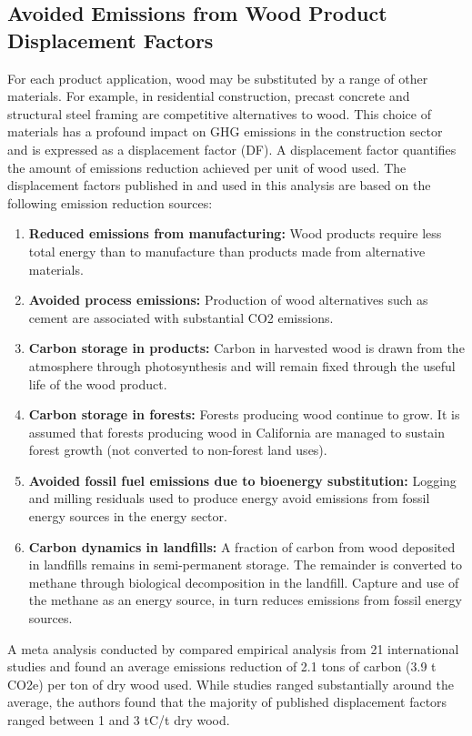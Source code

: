 \documentclass[a4paper]{article}
\begin{document}
\subsection{Avoided Emissions from Wood Product Displacement Factors}
\label{sec:orgheadline19}

For each product application, wood may be substituted by a range of other materials. For example, in
residential construction, precast concrete and structural steel framing
are competitive alternatives to wood. This choice of materials has a profound impact on \ac{GHG} emissions in the
construction sector and is expressed as a displacement
factor (DF). A displacement factor quantifies the amount of emissions
reduction achieved per unit of wood used. The displacement factors published in
\citep{Sathre2010} and used in this analysis are based on the
following emission reduction sources:

\begin{enumerate}
\item \textbf{Reduced emissions from manufacturing:} Wood products require less total
energy than to manufacture than products made from alternative materials.
\item \textbf{Avoided process emissions:} Production of wood alternatives such as cement are associated with 
substantial CO2 emissions.
\item \textbf{Carbon storage in products:} Carbon in harvested wood is drawn from
the atmosphere through photosynthesis and will remain fixed through
the useful life of the wood product.
\item \textbf{Carbon storage in forests:} Forests producing wood continue to grow.
It is assumed that forests producing wood in California are managed
to sustain forest growth (not converted to non-forest land uses).
\item \textbf{Avoided fossil fuel emissions due to bioenergy substitution:}
Logging and milling residuals used to produce energy avoid emissions
from fossil energy sources in the energy sector.
\item \textbf{Carbon dynamics in landfills:} A fraction of carbon from wood
deposited in landfills remains in semi-permanent storage.
The remainder is converted to methane through biological
decomposition in the landfill. Capture and use of the methane as an
energy source, in turn reduces emissions from fossil energy sources.
\end{enumerate}

A meta analysis conducted by \citep{Sathre2010} compared empirical analysis from 21 international studies and found an
average emissions reduction of 2.1 tons of carbon (3.9 t CO2e) per ton
of dry wood used. While studies ranged substantially around the average, the
authors found that the majority of published displacement factors ranged
between 1 and 3 tC/t dry wood. 
\end{document}
